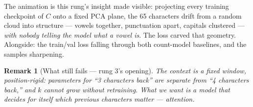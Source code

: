 \documentclass[11pt]{article}
\newtheorem{remark}{Remark}
\begin{document}
The animation is this rung's insight made visible: projecting every
training checkpoint of $C$ onto a fixed PCA plane, the 65 characters
drift from a random cloud into structure --- vowels together,
punctuation apart, capitals clustered --- \emph{with nobody telling the
model what a vowel is}. The loss carved that geometry. Alongside: the
train/val loss falling through both count-model baselines, and the
samples sharpening.

\begin{remark}[What still fails --- rung 3's opening]
The context is a \emph{fixed} window, position-rigid: parameters for
``3 characters back'' are separate from ``4 characters back,'' and
$k$ cannot grow without retraining. What we want is a model that
\emph{decides for itself} which previous characters matter ---
attention.
\end{remark}
\end{document}
